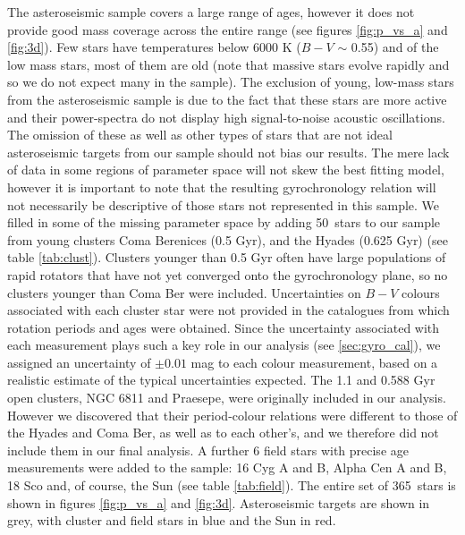 \documentclass[useAMS, usenatbib]{mn2e}
\newcommand{\nHC}{50~}
\newcommand{\ntotal}{365~}
\begin{document}
The asteroseismic sample covers a large range of ages, however it does not
provide good mass coverage across the entire range (see figures
\ref{fig:p_vs_a} and \ref{fig:3d}).
Few stars have temperatures below 6000 K ($B-V$ $\sim$ 0.55) and of the low
mass stars, most of them are old (note that massive stars evolve rapidly and
so we do not expect many in the sample).
The exclusion of young, low-mass stars from the asteroseismic sample is due to
the fact that these stars are more active and their power-spectra do not
display high signal-to-noise acoustic oscillations.
The omission of these as well as other types of stars that are not ideal
asteroseismic targets from our sample should not bias our results.
The mere lack of data in some regions of parameter space will not skew the
best fitting model, however it is important to note that the resulting
gyrochronology relation will not necessarily be descriptive of those stars not represented in this sample.  %
We filled in some of the missing parameter space by adding \nHC stars to our
sample from young clusters Coma Berenices (0.5 Gyr), and the Hyades
(0.625 Gyr) (see table \ref{tab:clust}).
Clusters younger than 0.5 Gyr often have large populations of rapid rotators
that have not yet converged onto the gyrochronology plane, so no clusters
younger than Coma Ber were included.
Uncertainties on $B-V$ colours associated with each cluster star were not
provided in the catalogues from which rotation periods and ages were obtained.
Since the uncertainty associated with each measurement plays such a key role
in our analysis (see \textsection \ref{sec:gyro_cal}), we assigned an
uncertainty of
$\pm 0.01$ %
mag to each colour measurement, based on a realistic estimate of the
typical uncertainties expected.
The 1.1 and 0.588 Gyr open clusters, NGC 6811 and Praesepe, were originally
included in our analysis.
However we discovered that their period-colour relations were different to
those of the Hyades and Coma Ber, as well as to each other's, and we therefore
did not include them in our final analysis.
A further 6 field stars with precise age measurements were added to the
sample: 16 Cyg A and B, Alpha Cen A and B, 18 Sco and, of course, the Sun
(see table \ref{tab:field}).
The entire set of \ntotal stars is shown in figures \ref{fig:p_vs_a} and
\ref{fig:3d}.
Asteroseismic targets are shown in grey, with cluster and field stars in blue
and the Sun in red.
\end{document}
